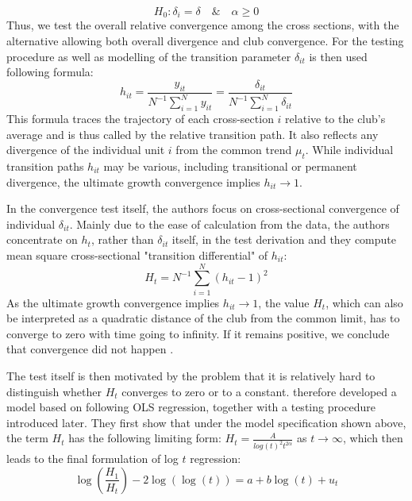 \documentclass[11pt]{article}
\begin{document}
\begin{equation} \label{eq6} H_0: \delta_{i} = \delta \quad \& \quad \alpha \geq 0 \end{equation} Thus, we test the overall relative convergence among the cross sections, with the alternative allowing both overall divergence and club convergence.
For the testing procedure as well as modelling of the transition parameter $\delta_{it}$ is then used following formula:
\begin{equation}\label{eq8}h_{it} = \frac{y_{it}}{N^{-1}\sum\limits_{i=1}^Ny_{it}} = \frac{\delta_{it}}{N^{-1}\sum\limits_{i=1}^N\delta_{it}}\end{equation}
This formula traces the trajectory of each cross-section $i$ relative to the club's average and is thus called by \citet{phillips2009economic} the relative transition path. It also reflects any divergence of the individual unit $i$ from the common trend $\mu_t$. While individual transition paths $h_{it}$ may be various, including transitional or permanent divergence, the ultimate growth convergence implies \(h_{it} \rightarrow 1\).

In the convergence test itself, the authors focus on cross-sectional convergence of individual $\delta_{it}$. Mainly due to the ease of calculation from the data, the authors concentrate on $h_{t}$, rather than $\delta_{it}$ itself, in the test derivation and they compute mean square cross-sectional "transition differential" of $h_{it}$:
\begin{equation}\label{eq9}H_t = N^{-1}\sum\limits_{i=1}^N(h_{it} - 1)^2 \end{equation}
As the ultimate growth convergence implies \(h_{it} \rightarrow 1\), the value $H_{t}$, which can also be interpreted as a quadratic distance of the club from the common limit, has to converge to zero with time going to infinity. If it remains positive, we conclude that convergence did not happen \citep{phillips2009economic}.

The test itself is then motivated by the problem that it is relatively hard to distinguish whether $H_t$ converges to zero or to a constant. \citet{phillips2007transition} therefore developed a model based on following OLS regression, together with a testing procedure introduced later. They first show that under the model specification shown above, the term $H_{t}$ has the following limiting form: \(H_{t} = \frac{A}{log (t)^2t^{2\alpha}}\) as \(t \rightarrow \infty\), which then leads to the final formulation of log $t$ regression:
\begin{equation}\label{eq10}\log\left(\frac{H_1}{H_t}\right)-2\log(\log(t)) = a + b\log(t) + u_t\end{equation}
\end{document}
